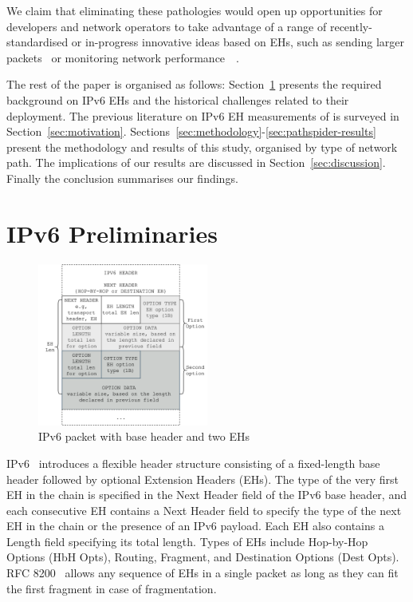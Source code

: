 \documentclass[conference]{IEEEtran}
\begin{document}
We claim that eliminating these pathologies would open up opportunities for
developers and network operators to take advantage of a range of recently-standardised or in-progress innovative ideas based on EHs, such as sending larger packets~\cite{rfc9268} or monitoring network
performance~\cite{rfc8250}~\cite{ietf-ippm-ioam-ipv6-options-10}.

The rest of the paper is organised as follows:  Section~\ref{sec:background} presents
the required background on IPv6 EHs and the historical challenges related to
their deployment.  The previous literature on IPv6
EH measurements of is surveyed in Section~\ref{sec:motivation}.
Sections~\ref{sec:methodology}-\ref{sec:pathspider-results} present the
methodology and results of this study, organised by type of network path.  The
implications of our results are discussed in Section~\ref{sec:discussion}.
Finally the conclusion summarises our findings.

\section{IPv6 Preliminaries}
\label{sec:background}

\label{sec:ipv6-option-deployment}

\begin{figure}
\centering
  \includegraphics[width=0.5\textwidth]{ehformat.png}
  \caption{IPv6 packet with base header and two EHs}
  \label{fig:eh-format}
\end{figure}


IPv6~\cite{rfc2460} introduces a flexible header structure consisting of a
fixed-length base header followed by optional Extension Headers (EHs). 
The type of the very first EH in the chain is specified in the Next Header field of the IPv6 base header, and each consecutive EH contains a Next Header field to specify the type of the next EH in the chain or the presence of an IPv6 payload. Each EH also contains a Length field specifying its total length.
Types of EHs include Hop-by-Hop Options (HbH Opts), Routing, Fragment, and
Destination Options (Dest Opts).  RFC 8200~\cite{RFC8200} allows any sequence
of EHs in a single packet as long as they can fit the first fragment in case of
fragmentation.
\end{document}
